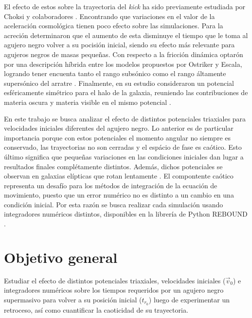 	El efecto de estos sobre la trayectoria del \textit{kick} ha sido previamente estudiada por Choksi y colaboradores \cite{choksi2017recoiling}. Encontrando que variaciones en el valor de la aceleraci\'on cosmol\'ogica tienen poco efecto sobre las simulaciones. Para la acreci\'on determinaron que el aumento de esta disminuye el tiempo que le toma al agujero negro volver a su pocisi\'on inicial, siendo su efecto m\'as relevante para agujeros negros de masas peque\~nas. Con respecto a la fricci\'on din\'amica optar\'on por una descripci\'on h\'ibrida entre los modelos propuestos por Ostriker y Escala, logrando tener encuenta tanto el rango subs\'onico como el rango \'altamente supers\'onico del arratre \cite{ostriker1999dynamical, escala2005role}. Finalmente, en su estudio consideraron un potencial esf\'ericamente sim\'etrico para el halo de la galaxia, reuniendo las contribuciones de materia oscura y materia visible en el mismo potencial \cite{choksi2017recoiling}.
		
	En este trabajo se busca analizar el efecto de distintos potenciales triaxiales para velocidades iniciales diferentes del agujero negro. Lo anterior es de particular importancia porque con estos potenciales el momento angular no siempre es conservado, las trayectorias no son cerradas y el esp\'acio de fase es ca\'otico. Esto \'ultimo significa que pequeñas variaciones en las condiciones iniciales dan lugar a resultados finales compl\'etamente distintos. Adem\'as, dichos potenciales se observan en galaxias el\'ipticas que rotan lentamente \cite{buote2002chandra, binney1978elliptical}. El compontente ca\'otico representa un desaf\'io para los m\'etodos de integraci\'on de la ecuaci\'on de movimiento, puesto que un error num\'erico no es distinto a un cambio en una condici\'on inicial. Por esta raz\'on se busca realizar cada simulaci\'on usando integradores num\'ericos distintos, disponibles en la librer\'ia de Python REBOUND \cite{larson2017modeling}.
	
\section{Objetivo general}
	Estudiar el efecto de distintos potenciales triaxiales, velocidades iniciales ($\vec{v}_0$) e integradores num\'ericos sobre los tiempos requeridos por un agujero negro supermasivo para volver a su posici\'on inicial ($t_{r_0}$) luego de experimentar un retroceso, as\'i como cuantificar la caoticidad de su trayectoria.
	
